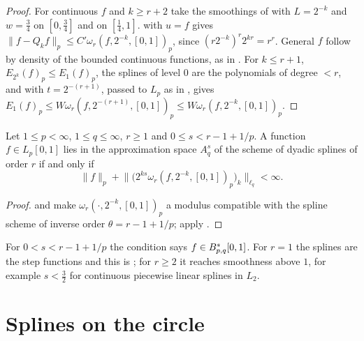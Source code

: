 \begin{proof}
\leanok
For continuous $f$ and $k \geq r + 2$ take the smoothings of  with
$L = 2^{-k}$ and $w = \tfrac34$ on $[0, \tfrac34]$ and on $[\tfrac14, 1]$. 
with $u = f$ gives $\|f - Q_k f\|_p \leq C' \omega_r(f, 2^{-k}, [0,1])_p$, since
$(r 2^{-k})^r 2^{kr} = r^r$. General
$f$ follow by density of the bounded continuous functions, as in . For
$k \leq r + 1$, $E_{2^k}(f)_p \leq E_1(f)_p$, the splines of level $0$ are the polynomials of
degree $< r$, and  with $t = 2^{-(r+1)}$, passed to $L_p$ as in
, gives $E_1(f)_p \leq W \omega_r(f, 2^{-(r+1)}, [0,1])_p \leq W \omega_r(f, 2^{-k}, [0,1])_p$.
\end{proof}

\begin{theorem}
\label{thm:spline-besov}
\leanok
{}
Let $1 \leq p < \infty$, $1 \leq q \leq \infty$, $r \geq 1$ and $0 \leq s < r - 1 + 1/p$. A function
$f \in L_p[0,1]$ lies in the approximation space $A^s_q$ of the scheme of dyadic splines of
order $r$ if and only if
\[
  \|f\|_p + \bigl\| \bigl( 2^{ks} \omega_r(f, 2^{-k}, [0,1])_p \bigr)_k \bigr\|_{\ell_q} < \infty .
\]
\end{theorem}

\begin{proof}
\leanok
{} and  make
$\omega_r(\cdot, 2^{-k}, [0,1])_p$ a modulus compatible with the spline scheme of inverse order
$\theta = r - 1 + 1/p$; apply .
\end{proof}

For $0 < s < r - 1 + 1/p$ the condition says $f \in B^{s}_{p,q}[0, 1]$. For $r = 1$ the
splines are the step functions and this is ; for $r \geq 2$ it reaches
smoothness above $1$, for example $s < \tfrac32$ for continuous piecewise linear splines in $L_2$.

\section{Splines on the circle}

